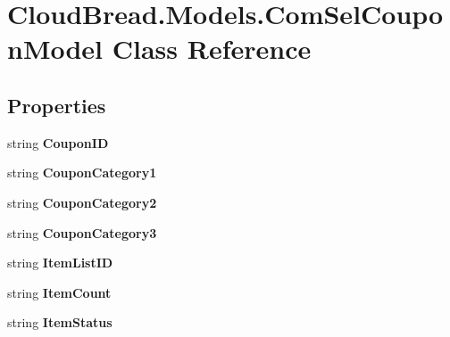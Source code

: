 \hypertarget{a00053}{}\section{Cloud\+Bread.\+Models.\+Com\+Sel\+Coupon\+Model Class Reference}
\label{a00053}
\subsection*{Properties}
\begin{DoxyCompactItemize}
\item 
string {\bfseries Coupon\+ID}\hypertarget{a00053_a55fd9df6071763990ab70747eba97b95}{}\label{a00053_a55fd9df6071763990ab70747eba97b95}

\item 
string {\bfseries Coupon\+Category1}\hypertarget{a00053_a6c563959b3b352c16f27596a226af5af}{}\label{a00053_a6c563959b3b352c16f27596a226af5af}

\item 
string {\bfseries Coupon\+Category2}\hypertarget{a00053_aad43ac036dfef3f04192ca21d2c51bd8}{}\label{a00053_aad43ac036dfef3f04192ca21d2c51bd8}

\item 
string {\bfseries Coupon\+Category3}\hypertarget{a00053_ab791e0eb6679bfbd0a02dd61b3a81d5a}{}\label{a00053_ab791e0eb6679bfbd0a02dd61b3a81d5a}

\item 
string {\bfseries Item\+List\+ID}\hypertarget{a00053_ad1f50b34ecc9a2c50696a0c0a9073453}{}\label{a00053_ad1f50b34ecc9a2c50696a0c0a9073453}

\item 
string {\bfseries Item\+Count}\hypertarget{a00053_a106156e9c0943068c3cc88802c5e0c90}{}\label{a00053_a106156e9c0943068c3cc88802c5e0c90}

\item 
string {\bfseries Item\+Status}\hypertarget{a00053_ac4f24e3e1e2e78e72044b2f8a730f451}{}\label{a00053_ac4f24e3e1e2e78e72044b2f8a730f451}


\end{DoxyCompactItemize}
